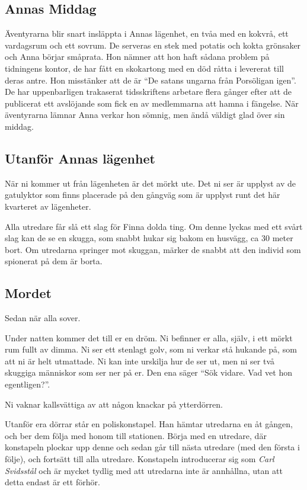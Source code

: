 \subsection{Annas Middag}

Äventyrarna blir snart insläppta i Annas lägenhet, en tvåa med en kokvrå, ett vardagsrum och ett sovrum. De serveras en stek med potatis och kokta grönsaker och Anna börjar småprata. Hon nämner att hon haft sådana problem på tidningens kontor, de har fått en skokartong med en död råtta i levererat till deras antre. Hon misstänker att de är ``De satans ungarna från Porsöligan igen''. De har uppenbarligen trakaserat tidsskriftens arbetare flera gånger efter att de publicerat ett avslöjande som fick en av medlemmarna att hamna i fängelse. När äventyrarna lämnar Anna verkar hon sömnig, men ändå väldigt glad över sin middag. 

\subsection{Utanför Annas lägenhet}
När ni kommer ut från lägenheten är det mörkt ute. Det ni ser är upplyst av de gatulyktor som finns placerade på den gångväg som är upplyst runt det här kvarteret av lägenheter.

Alla utredare får slå ett slag för Finna dolda ting. Om denne lyckas med ett svårt slag kan de se en skugga, som snabbt hukar sig bakom en husvägg, ca 30 meter bort. Om utredarna springer mot skuggan, märker de snabbt att den individ som spionerat på dem är borta.

\subsection{Mordet}
Sedan när alla sover.

\begin{displayquote}
	Under natten kommer det till er en dröm. Ni befinner er alla, själv, i ett mörkt rum fullt av dimma. Ni ser ett stenlagt golv, som ni verkar stå hukande på, som att ni är helt utmattade. Ni kan inte urskilja hur de ser ut, men ni ser två skuggiga människor som ser ner på er. Den ena säger ``Sök vidare. Vad vet hon egentligen?''.

	Ni vaknar kallsvättiga av att någon knackar på ytterdörren.
\end{displayquote}
%
Utanför era dörrar står en poliskonstapel. Han hämtar utredarna en åt gången, och ber dem följa med honom till stationen. Börja med en utredare, där konstapeln plockar upp denne och sedan går till nästa utredare (med den första i följe), och fortsätt till alla utredare. Konstapeln introducerar sig som \textit{Carl Svidsstål} \sectiondescribe{\ref{kar:KonstapelCarlSvidstal}} och är mycket tydlig med att utredarna inte är annhållna, utan att detta endast är ett förhör. 

